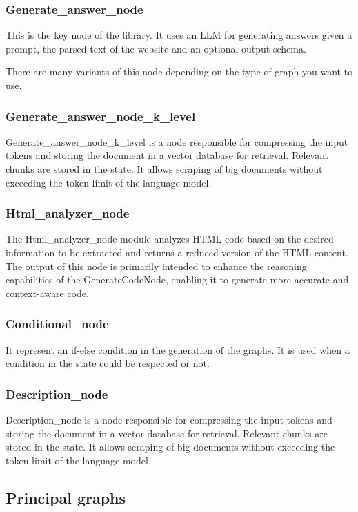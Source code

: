 \subsubsection{Generate\_answer\_node}
This is the key node of the library. It uses an LLM for generating answers given a prompt, the parsed text of the website and an optional output schema.

There are many variants of this node depending on the type of graph you want to use.

\subsubsection{Generate\_answer\_node\_k\_level}
Generate\_answer\_node\_k\_level is a node responsible for compressing the input tokens and storing the document in a vector database for retrieval. Relevant chunks are stored in the state. It allows scraping of big documents without exceeding the token limit of the language model.

\subsubsection{Html\_analyzer\_node}
The Html\_analyzer\_node module analyzes HTML code based on the desired information to be extracted and returns a reduced version of the HTML content. The output of this node is primarily intended to enhance the reasoning capabilities of the GenerateCodeNode, enabling it to generate more accurate and context-aware code.

\subsubsection{Conditional\_node}
It represent an if-else condition in the generation of the graphs. It is used when a condition in the state could be respected or not.

\subsubsection{Description\_node}
Description\_node is a node responsible for compressing the input tokens and storing the document in a vector database for retrieval. Relevant chunks are stored in the state. It allows scraping of big documents without exceeding the token limit of the language model.

\subsection{Principal graphs}

